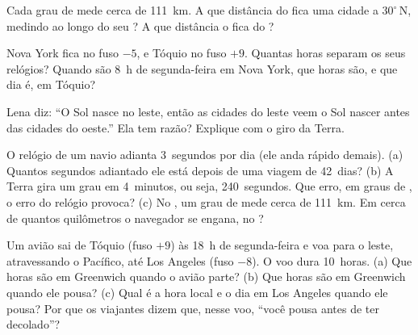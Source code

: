 \begin{exercise}[$\star\star$]\label{exo:g6:latitude-longitude:8}
Cada grau de  mede cerca de \qty{111}{km}. A que distância do
 fica uma cidade a $30^\circ$\,N, medindo ao longo do seu ?
A que distância o  fica do ?
\end{exercise}

\begin{exercise}[$\star\star$]\label{exo:g6:latitude-longitude:9}
Nova York fica no fuso $-5$, e Tóquio no fuso $+9$. Quantas horas separam
os seus relógios? Quando são 8~h de segunda-feira em Nova York, que horas
são, e que dia é, em Tóquio?
\end{exercise}

\begin{exercise}[$\star\star$]\label{exo:g6:latitude-longitude:10}
Lena diz: ``O Sol nasce no leste, então as cidades do leste veem o Sol
nascer antes das cidades do oeste.'' Ela tem razão? Explique com o giro da
Terra.
\end{exercise}

\begin{exercise}[$\star\star\star$]\label{exo:g6:latitude-longitude:11}
O relógio de um navio adianta 3~segundos por dia (ele anda rápido demais).
(a) Quantos segundos adiantado ele está depois de uma viagem de 42~dias?
(b) A Terra gira um grau em 4~minutos, ou seja, 240~segundos. Que erro, em
graus de , o erro do relógio provoca? (c) No , um grau de
 mede cerca de \qty{111}{km}. Em cerca de quantos quilômetros o
navegador se engana, no ?
\end{exercise}

\begin{exercise}[$\star\star\star$]\label{exo:g6:latitude-longitude:12}
Um avião sai de Tóquio (fuso $+9$) às 18~h de segunda-feira e voa para o
leste, atravessando o Pacífico, até Los Angeles (fuso $-8$). O voo dura
10~horas. (a) Que horas são em Greenwich quando o avião parte? (b) Que
horas são em Greenwich quando ele pousa? (c) Qual é a hora local e o dia
em Los Angeles quando ele pousa? Por que os viajantes dizem que, nesse
voo, ``você pousa antes de ter decolado''?
\end{exercise}

